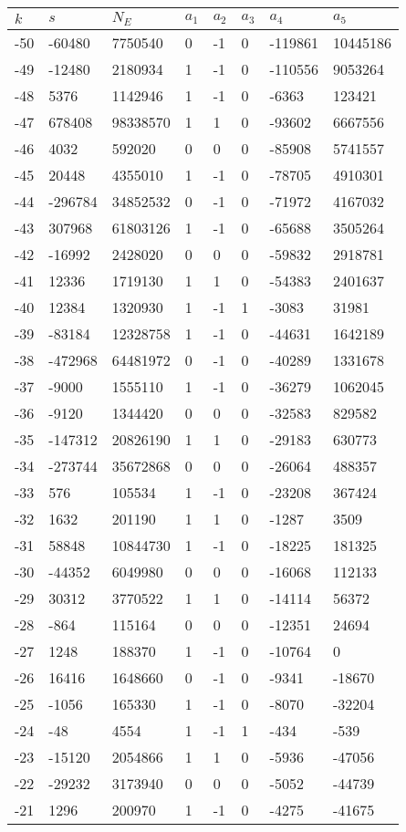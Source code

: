 \documentclass{amsart}
\begin{document}
\begin{longtable}{|l|l|l|lllll|}
\hline
$k$ & $s$ & $N_E$ & $a_1$ & $a_2$ & $a_3$ & $a_4$ & $a_5$\\
\hline
-50&-60480&7750540&0&-1&0&-119861&10445186\\
-49&-12480&2180934&1&-1&0&-110556&9053264\\
-48&5376&1142946&1&-1&0&-6363&123421\\
-47&678408&98338570&1&1&0&-93602&6667556\\
-46&4032&592020&0&0&0&-85908&5741557\\
-45&20448&4355010&1&-1&0&-78705&4910301\\
-44&-296784&34852532&0&-1&0&-71972&4167032\\
-43&307968&61803126&1&-1&0&-65688&3505264\\
-42&-16992&2428020&0&0&0&-59832&2918781\\
-41&12336&1719130&1&1&0&-54383&2401637\\
-40&12384&1320930&1&-1&1&-3083&31981\\
-39&-83184&12328758&1&-1&0&-44631&1642189\\
-38&-472968&64481972&0&-1&0&-40289&1331678\\
-37&-9000&1555110&1&-1&0&-36279&1062045\\
-36&-9120&1344420&0&0&0&-32583&829582\\
-35&-147312&20826190&1&1&0&-29183&630773\\
-34&-273744&35672868&0&0&0&-26064&488357\\
-33&576&105534&1&-1&0&-23208&367424\\
-32&1632&201190&1&1&0&-1287&3509\\
-31&58848&10844730&1&-1&0&-18225&181325\\
-30&-44352&6049980&0&0&0&-16068&112133\\
-29&30312&3770522&1&1&0&-14114&56372\\
-28&-864&115164&0&0&0&-12351&24694\\
-27&1248&188370&1&-1&0&-10764&0\\
-26&16416&1648660&0&-1&0&-9341&-18670\\
-25&-1056&165330&1&-1&0&-8070&-32204\\
-24&-48&4554&1&-1&1&-434&-539\\
-23&-15120&2054866&1&1&0&-5936&-47056\\
-22&-29232&3173940&0&0&0&-5052&-44739\\
-21&1296&200970&1&-1&0&-4275&-41675\\

\end{longtable}
\end{document}

